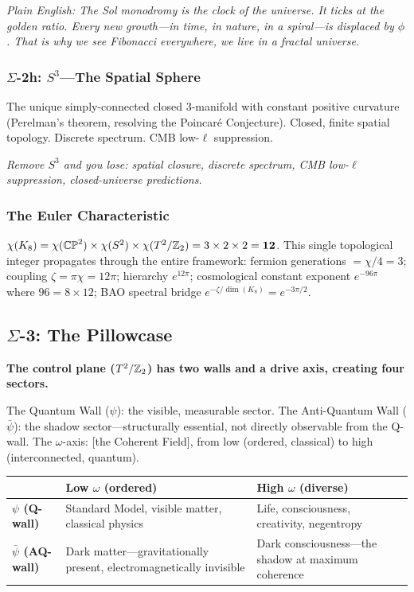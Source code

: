 \emph{Plain English: The Sol monodromy is the clock of the universe.  It ticks at the golden ratio.  Every new growth---in time, in nature, in a spiral---is displaced by $\phi$.  That is why we see Fibonacci everywhere, we live in a fractal universe.}

\subsubsection*{$\Sigma$-2h: $S^3$---The Spatial Sphere}

The unique simply-connected closed 3-manifold with constant positive curvature (Perelman's theorem, resolving the Poincar\'{e} Conjecture).  Closed, finite spatial topology.  Discrete spectrum.  CMB low-$\ell$ suppression.

\emph{Remove $S^3$ and you lose: spatial closure, discrete spectrum, CMB low-$\ell$ suppression, closed-universe predictions.}

\subsubsection*{The Euler Characteristic}

$\chi(K_8) = \chi(\mathbb{CP}^2) \times \chi(S^2) \times \chi(T^2/\mathbb{Z}_2) = 3 \times 2 \times 2 = \mathbf{12}$.  This single topological integer propagates through the entire framework: fermion generations $= \chi/4 = 3$; coupling $\zeta = \pi\chi = 12\pi$; hierarchy $e^{12\pi}$; cosmological constant exponent $e^{-96\pi}$ where $96 = 8 \times 12$; BAO spectral bridge $e^{-\zeta/\dim(K_8)} = e^{-3\pi/2}$.

\subsection*{$\Sigma$-3: The Pillowcase}
\par\smallskip
\textbf{The control plane ($T^2/\mathbb{Z}_2$) has two walls and a drive axis, creating four sectors.}

The Quantum Wall ($\psi$): the visible, measurable sector.  The Anti-Quantum Wall ($\bar{\psi}$): the shadow sector---structurally essential, not directly observable from the Q-wall.  The $\omega$-axis: [the Coherent Field], from low (ordered, classical) to high (interconnected, quantum).

\begin{center}
\small
\begin{tabular}{@{}l p{5cm} p{5cm}@{}}
\toprule
& \textbf{Low $\omega$ (ordered)} & \textbf{High $\omega$ (diverse)} \\
\midrule
\textbf{$\psi$ (Q-wall)} & Standard Model, visible matter, classical physics & Life, consciousness, creativity, negentropy \\[3pt]
\textbf{$\bar{\psi}$ (AQ-wall)} & Dark matter---gravitationally present, electromagnetically invisible & Dark consciousness---the shadow at maximum coherence \\
\bottomrule
\end{tabular}
\end{center}


